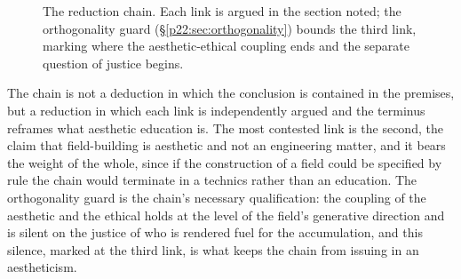 \begin{figure}[ht]
\centering
{}
\caption{The reduction chain. Each link is argued in the section noted; the orthogonality guard (\S\ref{p22:sec:orthogonality}) bounds the third link, marking where the aesthetic-ethical coupling ends and the separate question of justice begins.}
\label{p22:fig:chain}
\end{figure}

The chain is not a deduction in which the conclusion is contained in the premises, but a reduction in which each link is independently argued and the terminus reframes what aesthetic education is. The most contested link is the second, the claim that field-building is aesthetic and not an engineering matter, and it bears the weight of the whole, since if the construction of a field could be specified by rule the chain would terminate in a technics rather than an education. The orthogonality guard is the chain's necessary qualification: the coupling of the aesthetic and the ethical holds at the level of the field's generative direction and is silent on the justice of who is rendered fuel for the accumulation, and this silence, marked at the third link, is what keeps the chain from issuing in an aestheticism.

